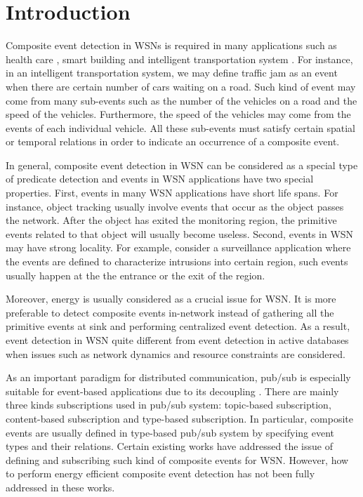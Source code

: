 \section{Introduction}
\label{sec:introduction}
Composite event \cite{jector} detection in WSNs is required in many applications such as health care \cite{lo:ban}, smart building \cite{lynch:shm} and intelligent transportation system \cite{klein:its}. For instance, in an intelligent transportation system, we may define traffic jam as an event when there are certain number of cars waiting on a road. Such kind of event may come from many sub-events such as the number of the vehicles on a road and the speed of the vehicles. Furthermore, the speed of the vehicles may come from the events of each individual vehicle. All these sub-events must satisfy certain spatial or temporal relations in order to indicate an occurrence of a composite event.

In general, composite event detection in WSN can be considered as a special type of predicate detection \cite{gag:predicate} and events in WSN applications have two special properties. First, events in many WSN applications have short life spans. For instance, object tracking usually involve events that occur as the object passes the network. After the object has exited the monitoring region, the primitive events related to that object will usually become useless. Second, events in WSN may have strong locality.  For example, consider a surveillance application where the events are defined to characterize intrusions into certain region, such events usually happen at the the entrance or the exit of the region. 

Moreover, energy is usually considered as a crucial issue for WSN. It is more preferable to detect composite events in-network instead of gathering all the primitive events at sink and performing centralized event detection. As a result, event detection in WSN quite different from event detection in active databases \cite{samos} when issues such as network dynamics and resource constraints are considered.

As an important paradigm for distributed communication, pub/sub is especially suitable for event-based applications due to its decoupling \cite{facespubsub}. There are mainly three kinds subscriptions used in pub/sub system: topic-based subscription, content-based subscription and type-based subscription. In particular, composite events are usually defined in type-based pub/sub system by specifying event types and their relations. Certain existing works \cite{lai:psware} have addressed the issue of defining and subscribing such kind of composite events for WSN. However, how to perform energy efficient composite event detection has not been fully addressed in these works.

